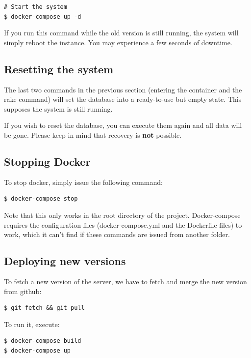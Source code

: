 \begin{verbatim}
# Start the system
$ docker-compose up -d
\end{verbatim}

If you run this command while the old version is still running, the system will simply reboot the instance. You may experience a few seconds of downtime.

\subsection{Resetting the system}
The last two commands in the previous section (entering the container and the rake command) will set the database into a ready-to-use but empty state. This supposes the system is still running.

If you wish to reset the database, you can execute them again and all data will be gone. Please keep in mind that recovery is {\bf not} possible.

\subsection{Stopping Docker}
To stop docker, simply issue the following command:

\begin{verbatim}
$ docker-compose stop
\end{verbatim}

Note that this only works in the root directory of the project. Docker-compose requires the configuration files (docker-compose.yml and the Dockerfile files) to work, which it can't find if these commands are issued from another folder.

\subsection{Deploying new versions}
To fetch a new version of the server, we have to fetch and merge the new version from github:

\begin{verbatim}
$ git fetch && git pull
\end{verbatim}

To run it, execute:
\begin{verbatim}
$ docker-compose build
$ docker-compose up
\end{verbatim}

